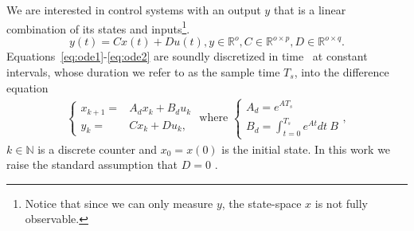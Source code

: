 \documentclass[sigconf]{llncs}
\newcommand{\mat}[1]{{#1}}
\renewcommand{\vec}[1]{{#1}}
\begin{document}
We are interested in control systems with an output $\vec{y}$ that is a linear combination of its states and inputs\footnote{Notice that since we can only measure $\vec{y}$, the state-space $\vec{x}$ is not fully observable.}.
\begin{equation}
\label{eq:ode2}  
\vec{y}(t)=\mat{C}\vec{x}(t)+\mat{D}\vec{u}(t), \vec{y} \in \mathbb{R}^o, \mat{C} \in \mathbb{R}^{o \times p}, \mat{D} \in \mathbb{R}^{o \times q}. 
\end{equation}
%
Equations~\eqref{eq:ode1}-\eqref{eq:ode2} are soundly discretized in
time~\cite{middleton1990digital,van1978computing} at constant intervals, whose 
duration we refer to as the sample time $T_s$, 
into the difference equation 
\begin{align}
\label{eq:plant}
\left\{
\begin{array}{rl}
\vec{x}_{k+1} =& \mat{A}_d \vec{x}_k+ \mat{B}_d \vec{u}_k\\
\vec{y}_{k} =& \mat{C} \vec{x}_k + \mat{D} \vec{u}_k, 
\end{array}
\right.
\text{ where }
\left\{
\begin{array}{l}
\mat{A}_d=e^{\mat{A}T_s}\\
\mat{B}_d = \int_{t = 0}^{T_s} e^{\mat{A} t} dt\ \mat{B}
\end{array}
\right.,
\end{align} 
%
$k \in \mathbb N$ is a discrete counter and $\vec{x}_{0}=\vec{x}(0)$ is the initial state. 
In this work we raise the standard assumption that $\mat{D}=\mat{0}$ \cite{Astrom08}.  

\end{document}

